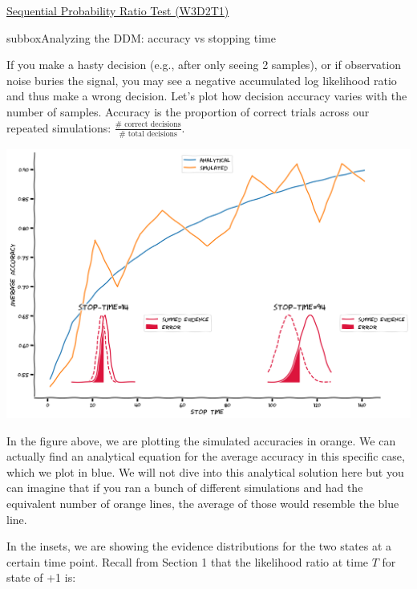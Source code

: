 \begin{textbox}{\href{https://compneuro.neuromatch.io/tutorials/W3D2_HiddenDynamics/student/W3D2_Tutorial1.html}{Sequential Probability Ratio Test (W3D2T1)}   }

\begin{subbox}{subbox}{Analyzing the DDM: accuracy vs stopping time}
\scriptsize

If you make a hasty decision (e.g., after only seeing 2 samples), or if observation noise buries the signal, you may see a negative accumulated log likelihood ratio and thus make a wrong decision. Let's plot how decision accuracy varies with the number of samples. Accuracy is the proportion of correct trials across our repeated simulations: $\frac{\# \textrm{ correct decisions}}{\# \textrm{ total decisions}}$.

\begin{center}
    
\includegraphics[scale=0.2]{Figures/HD/HD_Figure2.png}
\end{center}
In the figure above, we are plotting the simulated accuracies in orange. We can actually find an analytical equation for the average accuracy in this specific case, which we plot in blue. We will not dive into this analytical solution here but you can imagine that if you ran a bunch of different simulations and had the equivalent number of orange lines, the average of those would resemble the blue line. 

In the insets, we are showing the evidence distributions for the two states at a certain time point. Recall from Section 1 that the likelihood ratio at time $T$ for state of +1 is: 


\end{subbox}
\end{textbox}
